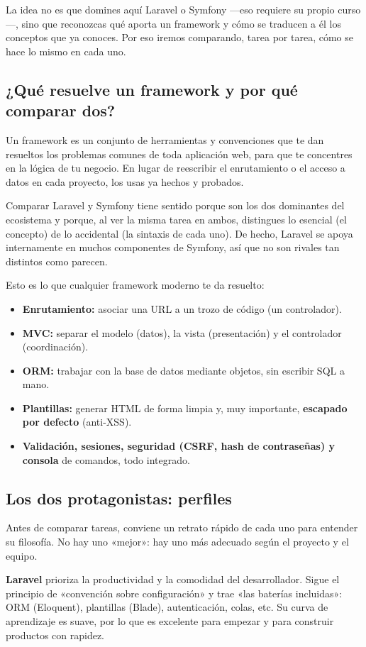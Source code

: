 \documentclass[11pt]{article}
\begin{document}
La idea no es que domines aquí Laravel o Symfony —eso requiere su propio curso—, sino que reconozcas qué aporta un framework y cómo se traducen a él los conceptos que ya conoces. Por eso iremos comparando, tarea por tarea, cómo se hace lo mismo en cada uno.

\subsection{¿Qué resuelve un framework y por qué comparar dos?}
Un framework es un conjunto de herramientas y convenciones que te dan resueltos los problemas comunes de toda aplicación web, para que te concentres en la lógica de tu negocio. En lugar de reescribir el enrutamiento o el acceso a datos en cada proyecto, los usas ya hechos y probados.

Comparar Laravel y Symfony tiene sentido porque son los dos dominantes del ecosistema y porque, al ver la misma tarea en ambos, distingues lo esencial (el concepto) de lo accidental (la sintaxis de cada uno). De hecho, Laravel se apoya internamente en muchos componentes de Symfony, así que no son rivales tan distintos como parecen.

Esto es lo que cualquier framework moderno te da resuelto:

\begin{itemize}[leftmargin=1.4em,itemsep=2pt,topsep=2pt]
\item \textbf{Enrutamiento:} asociar una URL a un trozo de código (un controlador).
\item \textbf{MVC:} separar el modelo (datos), la vista (presentación) y el controlador (coordinación).
\item \textbf{ORM:} trabajar con la base de datos mediante objetos, sin escribir SQL a mano.
\item \textbf{Plantillas:} generar HTML de forma limpia y, muy importante, \textbf{escapado por defecto} (anti-XSS).
\item \textbf{Validación, sesiones, seguridad (CSRF, hash de contraseñas) y consola} de comandos, todo integrado.
\end{itemize}
\subsection{Los dos protagonistas: perfiles}
Antes de comparar tareas, conviene un retrato rápido de cada uno para entender su filosofía. No hay uno «mejor»: hay uno más adecuado según el proyecto y el equipo.

\textbf{Laravel} prioriza la productividad y la comodidad del desarrollador. Sigue el principio de «convención sobre configuración» y trae «las baterías incluidas»: ORM (Eloquent), plantillas (Blade), autenticación, colas, etc. Su curva de aprendizaje es suave, por lo que es excelente para empezar y para construir productos con rapidez.
\end{document}
